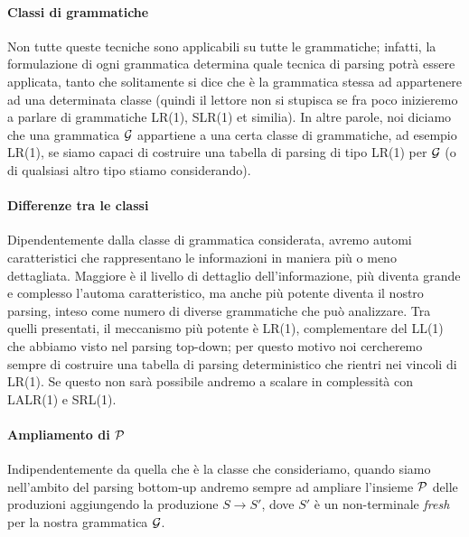 \documentclass[class=book, crop=false, oneside, 12pt]{standalone}
\begin{document}
\paragraph{Classi di grammatiche}
Non tutte queste tecniche sono applicabili su tutte le grammatiche; infatti, la formulazione di ogni grammatica determina quale tecnica di parsing potrà essere applicata, tanto che solitamente si dice che è la grammatica stessa ad appartenere ad una determinata classe (quindi il lettore non si stupisca se fra poco inizieremo a parlare di grammatiche LR(1), SLR(1) et similia). In altre parole, noi diciamo che una grammatica \(\G\) appartiene a una certa classe di grammatiche, ad esempio LR(1), se siamo capaci di costruire una tabella di parsing di tipo LR(1) per \(\G\) (o di qualsiasi altro tipo stiamo considerando).
\paragraph{Differenze tra le classi}
Dipendentemente dalla classe di grammatica considerata, avremo automi caratteristici che rappresentano le informazioni in maniera più o meno dettagliata. Maggiore è il livello di dettaglio dell'informazione, più diventa grande e complesso l'automa caratteristico, ma anche più potente diventa il nostro parsing, inteso come numero di diverse grammatiche che può analizzare. Tra quelli presentati, il meccanismo più potente è LR(1), complementare del LL(1) che abbiamo visto nel parsing top-down; per questo motivo noi cercheremo sempre di costruire una tabella di parsing deterministico che rientri nei vincoli di LR(1). Se questo non sarà possibile andremo a scalare in complessità con LALR(1) e SRL(1).

\paragraph{Ampliamento di \(\P\)}
\label{par:p-newprod}
 Indipendentemente da quella che è la classe che consideriamo, quando siamo nell'ambito del parsing bottom-up andremo sempre ad ampliare l'insieme \(\P\) delle produzioni aggiungendo la produzione \(S \to S'\), dove \(S'\) è un non-terminale \emph{fresh} per la nostra grammatica \(\G\).
\end{document}

